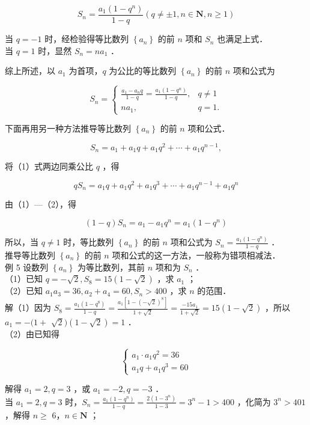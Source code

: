 \documentclass[10pt]{article}
\begin{document}
\[
S_{n}=\frac{a_{1}\left(1-q^{n}\right)}{1-q}(q \neq \pm 1, n \in \mathbf{N}, n \geqslant 1)
\]

当 \(q=-1\) 时，经检验得等比数列 \(\left\{a_{n}\right\}\) 的前 \(n\) 项和 \(S_{n}\) 也满足上式．\\
当 \(q=1\) 时，显然 \(S_{n}=n a_{1}\) ．

综上所述，以 \(a_{1}\) 为首项，\(q\) 为公比的等比数列 \(\left\{a_{n}\right\}\) 的前 \(n\) 项和公式为

\[
S_{n}= \begin{cases}\frac{a_{1}-a_{n} q}{1-q}=\frac{a_{1}\left(1-q^{n}\right)}{1-q}, & q \neq 1 \\ n a_{1}, & q=1 .\end{cases}
\]

下面再用另一种方法推导等比数列 \(\left\{a_{n}\right\}\) 的前 \(n\) 项和公式．

\[
S_{n}=a_{1}+a_{1} q+a_{1} q^{2}+\cdots+a_{1} q^{n-1},
\]

将（1）式两边同乘公比 \(q\) ，得

\[
q S_{n}=a_{1} q+a_{1} q^{2}+a_{1} q^{3}+\cdots+a_{1} q^{n-1}+a_{1} q^{n}
\]

由（1）—（2），得

\[
(1-q) S_{n}=a_{1}-a_{1} q^{n}=a_{1}\left(1-q^{n}\right)
\]

所以，当 \(q \neq 1\) 时，等比数列 \(\left\{a_{n}\right\}\) 的前 \(n\) 项和公式为 \(S_{n}=\frac{a_{1}\left(1-q^{n}\right)}{1-q}\) ．\\
推导等比数列 \(\left\{a_{n}\right\}\) 的前 \(n\) 项和公式的这一方法，一般称为错项相减法．\\
例 5 设数列 \(\left\{a_{n}\right\}\) 为等比数列，其前 \(n\) 项和为 \(S_{n}\) ．\\
（1）已知 \(q=-\sqrt{2}, S_{8}=15(1-\sqrt{2})\) ，求 \(a_{1}\) ；\\
（2）已知 \(a_{1} a_{3}=36, a_{2}+a_{4}=60, S_{n}>400\) ，求 \(n\) 的范围．\\
解（1）因为 \(S_{8}=\frac{a_{1}\left(1-q^{8}\right)}{1-q}=\frac{a_{1}\left[1-(-\sqrt{2})^{8}\right]}{1+\sqrt{2}}=\frac{-15 a_{1}}{1+\sqrt{2}}=15(1-\sqrt{2})\) ，所以 \(a_{1}=-(1+\) \(\sqrt{2})(1-\sqrt{2})=1\) ．\\
（2）由已知得

\[
\left\{\begin{array}{l}
a_{1} \cdot a_{1} q^{2}=36 \\
a_{1} q+a_{1} q^{3}=60
\end{array}\right.
\]

解得 \(a_{1}=2, q=3\) ，或 \(a_{1}=-2, q=-3\) ．\\
当 \(a_{1}=2, q=3\) 时，\(S_{n}=\frac{a_{1}\left(1-q^{n}\right)}{1-q}=\frac{2\left(1-3^{n}\right)}{1-3}=3^{n}-1>400\) ，化简为 \(3^{n}>401\) ，解得 \(n \geqslant\) 6，\(n \in \mathbf{N}\) ；
\end{document}
